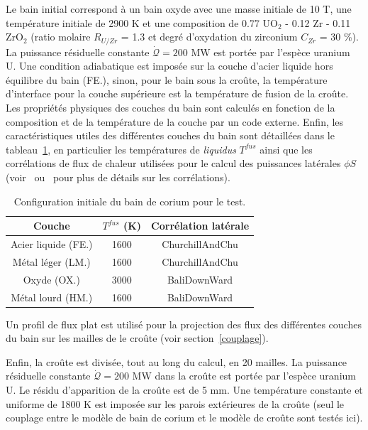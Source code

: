 Le bain initial correspond à un bain oxyde avec une masse initiale de 10 T, une température initiale de 2900 K et une composition de 0.77 UO$_2$ - 0.12 Zr - 0.11 ZrO$_2$ (ratio molaire $R_{U/Zr}$ = 1.3 et degré d'oxydation du zirconium $C_{Zr}$ = 30 \%). La puissance résiduelle constante $\dot{\mathcal{Q}} = 200$ MW est portée par l'espèce uranium U. Une condition adiabatique est imposée sur la couche d'acier liquide hors équilibre du bain (FE.), sinon, pour le bain sous la croûte, la température d'interface pour la couche supérieure est la température de fusion de la croûte. Les propriétés physiques des couches du bain sont calculés en fonction de la composition et de la température de la couche par un code externe. Enfin, les caractéristiques utiles des différentes couches du bain sont détaillées dans le tableau~\ref{tab:caracteristiques_couches_bain}, en particulier les températures de \textit{liquidus} $T^{fus}$ ainsi que les corrélations de flux de chaleur utilisées pour le calcul des puissances latérales $\phi S$ (voir~\cite{Bonnet1999} ou~\cite{Tourniaire2009a} pour plus de détails sur les corrélations).
\begin{table}
	\centering
	\begin{tabular}{ccc} 
	\hline
	Couche & $T^{fus}$ (K) & Corrélation latérale\\
	\hline
	Acier liquide (FE.) & 1600 & ChurchillAndChu\\
	Métal léger (LM.) & 1600 & ChurchillAndChu\\
	Oxyde (OX.) & 3000 & BaliDownWard\\
	Métal lourd (HM.) & 1600 & BaliDownWard\\
	\hline
	\end{tabular}	
	\caption{Configuration initiale du bain de corium pour le test.} 
	\label{tab:caracteristiques_couches_bain}
\end{table}
Un profil de flux plat est utilisé pour la projection des flux des différentes couches du bain sur les mailles de le croûte (voir section~\ref{couplage}).

Enfin, la croûte est divisée, tout au long du calcul, en 20 mailles. La puissance résiduelle constante $\dot{\mathcal{Q}} = 200$ MW dans la croûte est portée par l'espèce uranium U. Le résidu d'apparition de la croûte est de 5 mm. Une température constante et uniforme de 1800 K est imposée sur les parois extérieures de la croûte (seul le couplage entre le modèle de bain de corium et le modèle de croûte sont testés ici).

